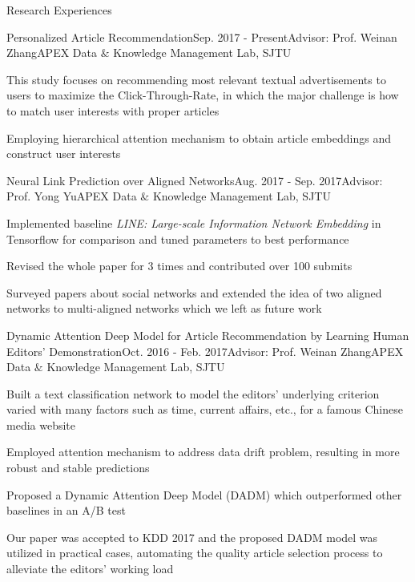 \documentclass{resume} %
\begin{document}
\begin{rSection}{Research Experiences}
\begin{rSubsection}{Personalized Article Recommendation}{Sep. 2017 - Present}{Advisor: Prof. Weinan Zhang}{APEX Data $\&$ Knowledge Management Lab, SJTU}
\item This study focuses on recommending most relevant textual advertisements to users to maximize the Click-Through-Rate, in which the major challenge is how to match user interests with proper articles
\item Employing hierarchical attention mechanism to obtain article embeddings and construct user interests
\end{rSubsection}
\begin{rSubsection}{Neural Link Prediction over Aligned Networks}{Aug. 2017 - Sep. 2017}{Advisor: Prof. Yong Yu}{APEX Data $\&$ Knowledge Management Lab, SJTU}
\item Implemented baseline \emph{LINE: Large-scale Information Network Embedding} in Tensorflow for comparison and tuned parameters to best performance
\item Revised the whole paper for 3 times and contributed over 100 submits 
\item Surveyed papers about social networks and extended the idea of two aligned networks to multi-aligned networks which we left as future work
\end{rSubsection}
\begin{rSubsection}{Dynamic Attention Deep Model for Article Recommendation
by Learning Human Editors’ Demonstration}{Oct. 2016 - Feb. 2017}{Advisor: Prof. Weinan Zhang}{APEX Data $\&$ Knowledge Management Lab, SJTU}
\item Built a text classification network to model the editors' underlying criterion varied with many factors such as time, current affairs, etc., for a famous Chinese media website
\item Employed attention mechanism to address data drift problem, resulting in more robust and stable predictions
\item Proposed a Dynamic Attention Deep Model (DADM) which outperformed other baselines in an A/B test
\item Our paper was accepted to KDD 2017 and the proposed DADM model was utilized in practical cases, automating the quality article selection process to alleviate the editors' working load\\\\
\end{rSubsection}
\end{rSection}
\end{document}
